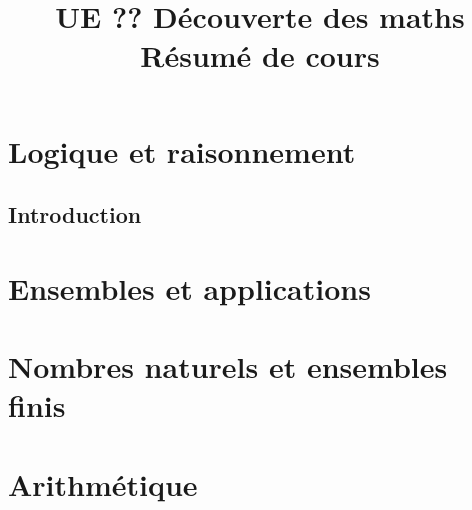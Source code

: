 \documentclass[10pt,a4paper]{article}
\theoremstyle{definition}
\begin{document}
\title{UE ?? Découverte des maths\\
Résumé de cours}
\maketitle
\tableofcontents


\section{Logique et raisonnement}
\subsection{Introduction}


\section{Ensembles et applications}

\section{Nombres naturels et ensembles finis}

\section{Arithmétique}
\end{document}
